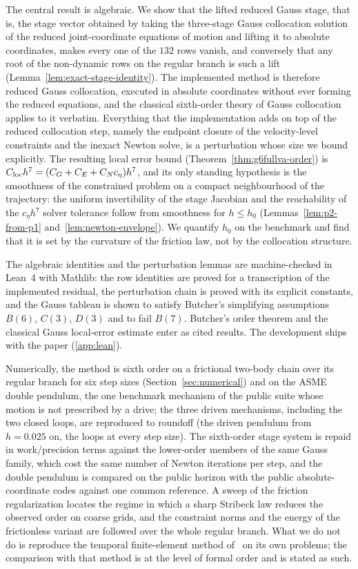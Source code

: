 The central result is algebraic. We show that the lifted reduced Gauss stage, that is, the stage
vector obtained by taking the three-stage Gauss collocation solution of the reduced joint-coordinate
equations of motion and lifting it to absolute coordinates, makes every one of the $132$ rows
vanish, and conversely that any root of the non-dynamic rows on the regular branch is such a lift
(Lemma~\ref{lem:exact-stage-identity}). The implemented method is therefore reduced Gauss
collocation, executed in absolute coordinates without ever forming the reduced equations, and the
classical sixth-order theory of Gauss collocation applies to it verbatim. Everything that the
implementation adds on top of the reduced collocation step, namely the endpoint closure of the
velocity-level constraints and the inexact Newton solve, is a perturbation whose size we bound
explicitly. The resulting local error bound (Theorem~\ref{thm:g6fullva-order}) is
$C_{\rm loc}h^7 = (C_G + C_E + C_N c_\eta)h^7$, and its only standing hypothesis is the smoothness
of the constrained problem on a compact neighbourhood of the trajectory: the uniform invertibility
of the stage Jacobian and the reachability of the $c_\eta h^7$ solver tolerance follow from
smoothness for $h\le h_0$ (Lemmas~\ref{lem:p2-from-p1} and~\ref{lem:newton-envelope}). We quantify
$h_0$ on the benchmark and find that it is set by the curvature of the friction law, not by the
collocation structure.

The algebraic identities and the perturbation lemmas are machine-checked in Lean~4 with Mathlib:
the row identities are proved for a transcription of the implemented residual, the perturbation
chain is proved with its explicit constants, and the Gauss tableau is shown to satisfy Butcher's
simplifying assumptions $B(6)$, $C(3)$, $D(3)$ and to fail $B(7)$. Butcher's order theorem and the
classical Gauss local-error estimate enter as cited results. The development ships with the paper
(\ref{app:lean}).

Numerically, the method is sixth order on a frictional two-body chain over its regular branch for
six step sizes (Section~\ref{sec:numerical}) and on the ASME double pendulum, the one benchmark
mechanism of the public suite whose motion is not prescribed by a drive; the three driven
mechanisms, including the two closed loops, are reproduced to roundoff (the driven pendulum from
$h=0.025$ on, the loops at every step size). The
sixth-order stage system is repaid in work/precision terms against the lower-order members of the
same Gauss family, which cost the same number of Newton iterations per step, and the double pendulum
is compared on the public horizon with the public absolute-coordinate codes against one common
reference. A sweep of the friction regularization locates the regime in which a sharp Stribeck law
reduces the observed order on coarse grids, and the constraint norms and the energy of the
frictionless variant are followed over the whole regular branch. What we do not do is reproduce the
temporal finite-element method of~\cite{chaturvedi2026tfe} on its own problems; the comparison with
that method is at the level of formal order and is stated as such.

